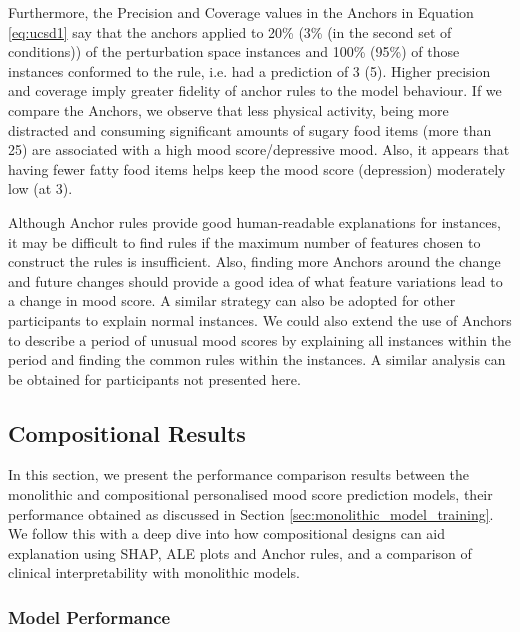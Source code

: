 Furthermore, the Precision and Coverage values in the Anchors in Equation \ref{eq:ucsd1} say that the anchors applied to 20\% (3\% (in the second set of conditions)) of the perturbation space instances and 100\% (95\%) of those instances conformed to the rule, i.e. had a prediction of 3 (5). Higher precision and coverage imply greater fidelity of anchor rules to the model behaviour. If we compare the Anchors, we observe that less physical activity, being more distracted and consuming significant amounts of sugary food items (more than 25) are associated with a high mood score/depressive mood. Also, it appears that having fewer fatty food items helps keep the mood score (depression) moderately low (at 3). 

Although Anchor rules provide good human-readable explanations for instances, it may be difficult to find rules if the maximum number of features chosen to construct the rules is insufficient. Also, finding more Anchors around the change and future changes should provide a good idea of what feature variations lead to a change in mood score. A similar strategy can also be adopted for other participants to explain normal instances. We could also extend the use of Anchors to describe a period of unusual mood scores by explaining all instances within the period and finding the common rules within the instances. A similar analysis can be obtained for participants not presented here.

\subsection{Compositional Results}\label{sec:depression_compositional_results}
In this section, we present the performance comparison results between the monolithic and compositional personalised mood score prediction models, their performance obtained as discussed in Section \ref{sec:monolithic_model_training}. We follow this with a deep dive into how compositional designs can aid explanation using SHAP, ALE plots and Anchor rules, and a comparison of clinical interpretability with monolithic models.

\subsubsection{Model Performance}


